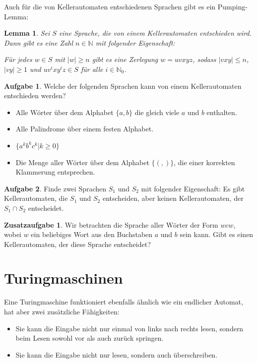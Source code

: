 \documentclass[a4paper,ngerman,12pt]{scrartcl}
\newcommand{\IN}{\mathbb{N}}
\newcommand{\INo}{\mathbb{N}_0}
\newcommand{\abs}[1]{\left|#1\right|}
\theoremstyle{definition}
\newtheorem{aufg}{Aufgabe}
\newtheorem{zaufg}{Zusatzaufgabe}
\theoremstyle{plain}
\newtheorem{lemma}[defn]{Lemma}
\theoremstyle{remark}
\begin{document}
Auch für die von Kellerautomaten entschiedenen Sprachen gibt es ein Pumping-Lemma:

\begin{lemma}
	Sei $S$ eine Sprache, die von einem Kellerautomaten entschieden wird. Dann gibt es eine Zahl $n \in \IN$ mit folgender Eigenschaft:
	
	Für jedes $w \in S$ mit $\abs{w} \geq n$ gibt es eine Zerlegung $w=uvxyz$, sodass $\abs{vxy} \leq n$, $\abs{vy} \geq 1$ und $uv^ixy^iz \in S$ für alle $i \in \INo$.
\end{lemma}

\begin{aufg}
	Welche der folgenden Sprachen kann von einem Kellerautomaten entschieden werden?
	\begin{itemize}
		\item Alle Wörter über dem Alphabet $\{a,b\}$ die gleich viele $a$ und $b$ enthalten.
		\item Alle Palindrome über einem festen Alphabet.
		\item $\{a^kb^kc^k | k \geq 0\}$
		\item Die Menge aller Wörter über dem Alphabet $\{(,)\}$, die einer korrekten Klammerung entsprechen.
	\end{itemize}
\end{aufg}

\begin{aufg}
	Finde zwei Sprachen $S_1$ und $S_2$ mit folgender Eigenschaft: Es gibt Kellerautomaten, die $S_1$ und $S_2$ entscheiden, aber keinen Kellerautomaten, der $S_1 \cap S_2$ entscheidet.
\end{aufg}

\begin{zaufg}
	Wir betrachten die Sprache aller Wörter der Form $wcw$, wobei $w$ ein beliebiges Wort aus den Buchstaben $a$ und $b$ sein kann. Gibt es einen Kellerautomaten, der diese Sprache entscheidet?
\end{zaufg}

\section{Turingmaschinen}

Eine Turingmaschine funktioniert ebenfalls ähnlich wie ein endlicher Automat, hat aber zwei zusätzliche Fähigkeiten:
\begin{itemize}
	\item Sie kann die Eingabe nicht nur einmal von links nach rechts lesen, sondern beim Lesen sowohl vor als auch zurück springen.
	\item Sie kann die Eingabe nicht nur lesen, sondern auch überschreiben.
\end{itemize}
\end{document}
